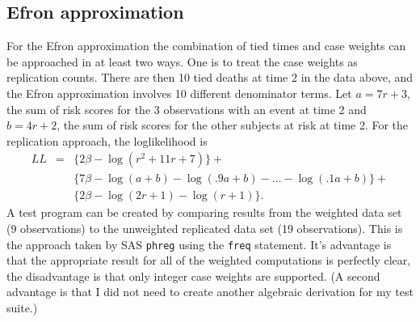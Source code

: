 \documentclass[11pt]{article}
\begin{document}
\subsection{Efron approximation}
For the Efron approximation the combination of tied times and case weights
can be approached in at least two ways.  
One is to treat the case weights as replication counts.  There are then
10 tied deaths at time 2 in the data above, and the Efron approximation
involves 10 different denominator terms.  
Let $a= 7r+3$, the sum of risk scores for the 3 observations with an event
at time 2 and $b=4r+2$, the sum of risk scores for the other subjects at
risk at time 2.
For the replication approach, the loglikelihood is 
\begin{eqnarray*}
LL &=& \{2\beta - \log(r^2 + 11r +7)\} + \\ 
   &&	\{7\beta - \log(a+b) - \log(.9a+b) - \ldots - \log(.1a+b) \} + \\
   &&	 \{2\beta - \log(2r+1) - \log(r+1)\}. 
\end{eqnarray*}
A test program can be created by comparing results from the weighted
data set (9 observations) to the unweighted replicated data set (19
observations).
This is the approach taken by SAS \texttt{phreg} using the \texttt{freq}
statement.  It's advantage is that the appropriate
result for all of the weighted computations is perfectly clear,
the disadvantage is that only integer case weights are supported.
(A second advantage is that I did not need to create another
algebraic derivation for my test suite.)
\end{document}

